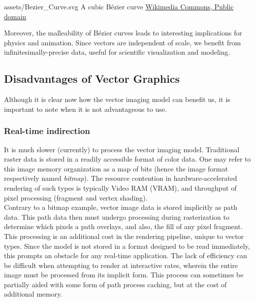 \svg
{assets/Bezier_Curve.svg}
{A cubic Bézier curve}
{\href{https://commons.wikimedia.org/wiki/File:Bezier_curve.svg}{Wikimedia Commons, Public domain}}
\label{fig:bezier_curve}

Moreover, the malleability of Bézier curves leads to interesting implications for physics and animation. Since vectors are independent of scale, we benefit from infinitesimally-precise data, useful for scientific visualization and modeling.\\

\subsection{Disadvantages of Vector Graphics}
Although it is clear now how the vector imaging model can benefit us, it is important to note when it is not advantageous to use.

\subsubsection{Real-time indirection}
It is much slower (currently) to process the vector imaging model. Traditional raster data is stored in a readily accessible format of color data. One may refer to this image memory organization as a map of bits (hence the image format respectively named \textit{bitmap}). The resource contention in hardware-accelerated rendering of such types is typically Video RAM (VRAM), and throughput of pixel processing (fragment and vertex shading).\\

Contrary to a bitmap example, vector image data is stored implicitly as path data. This path data then must undergo processing during rasterization to determine which pixels a path overlays, and also, the fill of any pixel fragment. This processing is an additional cost in the rendering pipeline, unique to vector types. Since the model is not stored in a format designed to be read immediately, this prompts an obstacle for any real-time application. The lack of efficiency can be difficult when attempting to render at interactive rates, wherein the entire image must be processed from its implicit form. This process can sometimes be partially aided with some form of path process caching, but at the cost of additional memory.